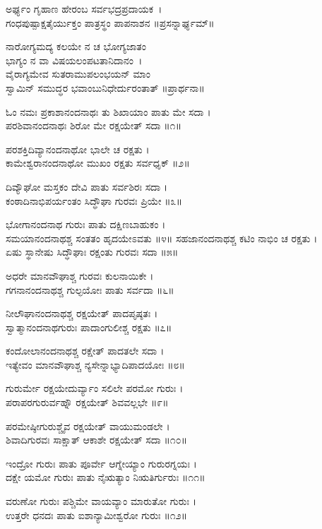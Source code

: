 ಅರ್ಘ್ಯಂ ಗೃಹಾಣ ಹೇರಂಬ ಸರ್ವಭದ್ರಪ್ರದಾಯಕ~।\\
ಗಂಧಪುಷ್ಪಾಕ್ಷತೈರ್ಯುಕ್ತಂ ಪಾತ್ರಸ್ಥಂ ಪಾಪನಾಶನ ॥ಪ್ರಸನ್ನಾರ್ಘ್ಯಮ್॥

ನಾರೋಗ್ಯಮದ್ಯ ಕಲಯೇ ನ ಚ ಭೋಗ್ಯಜಾತಂ\\
ಭಾಗ್ಯಂ ನ ವಾ ವಿಷಯಲಂಪಟತಾನಿದಾನಂ~।\\
ವೈರಾಗ್ಯಮೇವ ಸುತರಾಮುಪಲಂಭಯನ್ ಮಾಂ\\
ಸ್ವಾಮಿನ್ ಸಮುದ್ಧರ ಭವಾಂಬುನಿಧೇರ್ದುರಂತಾತ್ ॥ಪ್ರಾರ್ಥನಾ॥


ಓಂ ನಮಃ ಪ್ರಕಾಶಾನಂದನಾಥಃ ತು ಶಿಖಾಯಾಂ ಪಾತು ಮೇ ಸದಾ ।\\
ಪರಶಿವಾನಂದನಾಥಃ ಶಿರೋ ಮೇ ರಕ್ಷಯೇತ್ ಸದಾ ॥೧॥

ಪರಶಕ್ತಿದಿವ್ಯಾನಂದನಾಥೋ ಭಾಲೇ ಚ ರಕ್ಷತು ।\\
ಕಾಮೇಶ್ವರಾನಂದನಾಥೋ ಮುಖಂ ರಕ್ಷತು ಸರ್ವಧೃಕ್ ॥೨॥

ದಿವ್ಯೌಘೋ ಮಸ್ತಕಂ ದೇವಿ ಪಾತು ಸರ್ವಶಿರಃ ಸದಾ ।\\
ಕಂಠಾದಿನಾಭಿಪರ್ಯಂತಂ ಸಿದ್ಧೌಘಾ ಗುರವಃ ಪ್ರಿಯೇ ॥೩॥

ಭೋಗಾನಂದನಾಥ ಗುರುಃ ಪಾತು ದಕ್ಷಿಣಬಾಹುಕಂ ।\\
ಸಮಯಾನಂದನಾಥಶ್ಚ ಸಂತತಂ ಹೃದಯೇಽವತು ॥೪॥
\newpage
ಸಹಜಾನಂದನಾಥಶ್ಚ ಕಟಿಂ ನಾಭಿಂ ಚ ರಕ್ಷತು ।\\
ಏಷು ಸ್ಥಾನೇಷು ಸಿದ್ಧೌಘಾಃ ರಕ್ಷಂತು ಗುರವಃ ಸದಾ ॥೫॥

ಅಧರೇ ಮಾನವೌಘಾಶ್ಚ ಗುರವಃ ಕುಲನಾಯಿಕೇ ।\\
ಗಗನಾನಂದನಾಥಶ್ಚ ಗುಲ್ಫಯೋಃ ಪಾತು ಸರ್ವದಾ ॥೬॥

ನೀಲೌಘಾನಂದನಾಥಶ್ಚ ರಕ್ಷಯೇತ್ ಪಾದಪೃಷ್ಠತಃ ।\\
ಸ್ವಾತ್ಮಾನಂದನಾಥಗುರುಃ ಪಾದಾಂಗುಲೀಶ್ಚ ರಕ್ಷತು ॥೭॥

ಕಂದೋಲಾನಂದನಾಥಶ್ಚ ರಕ್ಷೇತ್ ಪಾದತಲೇ ಸದಾ ।\\
ಇತ್ಯೇವಂ ಮಾನವೌಘಾಶ್ಚ ನ್ಯಸೇನ್ನಾಭ್ಯಾದಿಪಾದಯೋಃ ॥೮॥

ಗುರುರ್ಮೇ ರಕ್ಷಯೇದುರ್ವ್ಯಾಂ ಸಲಿಲೇ ಪರಮೋ ಗುರುಃ ।\\
ಪರಾಪರಗುರುರ್ವಹ್ನೌ ರಕ್ಷಯೇತ್ ಶಿವವಲ್ಲಭೇ ॥೯॥

ಪರಮೇಷ್ಠೀಗುರುಶ್ಚೈವ ರಕ್ಷಯೇತ್ ವಾಯುಮಂಡಲೇ ।\\
ಶಿವಾದಿಗುರವಃ ಸಾಕ್ಷಾತ್ ಆಕಾಶೇ ರಕ್ಷಯೇತ್ ಸದಾ ॥೧೦॥

ಇಂದ್ರೋ ಗುರುಃ ಪಾತು ಪೂರ್ವೇ ಆಗ್ನೇಯ್ಯಾಂ ಗುರುರಗ್ನಯಃ ।\\
ದಕ್ಷೇ ಯಮೋ ಗುರುಃ ಪಾತು ನೈಋತ್ಯಾಂ ನಿಋತಿರ್ಗುರುಃ ॥೧೧॥

ವರುಣೋ ಗುರುಃ ಪಶ್ಚಿಮೇ ವಾಯವ್ಯಾಂ ಮಾರುತೋ ಗುರುಃ ।\\
ಉತ್ತರೇ ಧನದಃ ಪಾತು ಐಶಾನ್ಯಾಮೀಶ್ವರೋ ಗುರುಃ ॥೧೨॥

